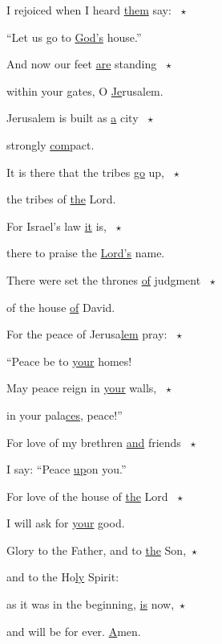 \noindent I rejoiced when I heard \uline{them} say: ~$\star$~\nopagebreak

“Let us go to \uline{God’s} house.”

\noindent And now our feet \uline{are} standing ~$\star$~\nopagebreak

within your gates, O \uline{Je}rusalem.

\noindent Jerusalem is built as \uline{a} city ~$\star$~\nopagebreak

strongly \uline{com}pact.

\noindent It is there that the tribes \uline{go} up, ~$\star$~\nopagebreak

the tribes of \uline{the} Lord.

\noindent For Israel’s law \uline{it} is, ~$\star$~\nopagebreak

there to praise the \uline{Lord’s} name.

\noindent There were set the thrones \uline{of} judgment ~$\star$~\nopagebreak

of the house \uline{of} David.

\noindent For the peace of Jerusa\uline{lem} pray: ~$\star$~\nopagebreak

“Peace be to \uline{your} homes!

\noindent May peace reign in \uline{your} walls, ~$\star$~\nopagebreak

in your pala\uline{ces,} peace!”

\noindent For love of my brethren \uline{and} friends ~$\star$~\nopagebreak

I say: “Peace \uline{up}on you.”

\noindent For love of the house of \uline{the} Lord ~$\star$~\nopagebreak

I will ask for \uline{your} good.

\noindent Glory to the Father, and to \uline{the} Son,~$\star$~\nopagebreak

and to the Ho\uline{ly} Spirit:

\noindent as it was in the beginning, \uline{is} now,~$\star$~\nopagebreak

and will be for ever. \uline{A}men.
